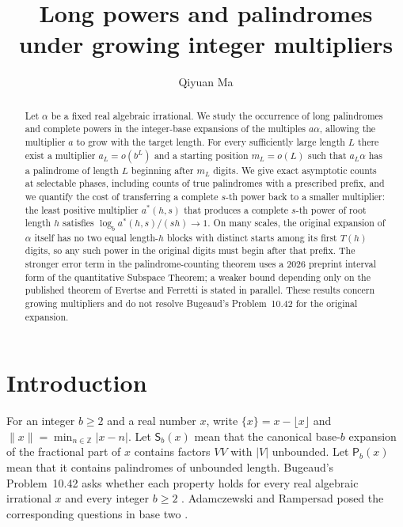 \documentclass[11pt,reqno,a4paper]{amsart}
\title[Powers and palindromes under growing multipliers]
{Long powers and palindromes under growing integer multipliers}
\date{}
\theoremstyle{remark}
\newcommand{\Z}{\mathbb Z}
\newcommand{\dist}[1]{\lVert#1\rVert}
\begin{document}
\author[Qiyuan Ma]{Qiyuan Ma\\[6pt]\protect\usebox{\affilbox}}

\begin{abstract}
Let $\alpha$ be a fixed real algebraic irrational. We study the occurrence of long palindromes and complete powers in the integer-base expansions of the multiples $a\alpha$, allowing the multiplier $a$ to grow with the target length. For every sufficiently large length $L$ there exist a multiplier $a_L=o(b^L)$ and a starting position $m_L=o(L)$ such that $a_L\alpha$ has a palindrome of length $L$ beginning after $m_L$ digits. We give exact asymptotic counts at selectable phases, including counts of true palindromes with a prescribed prefix, and we quantify the cost of transferring a complete $s$-th power back to a smaller multiplier: the least positive multiplier $a^*(h,s)$ that produces a complete $s$-th power of root length $h$ satisfies $\log_b a^*(h,s)/(sh)\to1$. On many scales, the original expansion of $\alpha$ itself has no two equal length-$h$ blocks with distinct starts among its first $T(h)$ digits, so any such power in the original digits must begin after that prefix. The stronger error term in the palindrome-counting theorem uses a $2026$ preprint interval form of the quantitative Subspace Theorem; a weaker bound depending only on the published theorem of Evertse and Ferretti is stated in parallel. These results concern growing multipliers and do not resolve Bugeaud's Problem~10.42 for the original expansion.
\end{abstract}
\maketitle

\section{Introduction}\label{sec:intro}

For an integer $b\ge2$ and a real number $x$, write $\{x\}=x-\lfloor x\rfloor$ and $\dist{x}=\min_{n\in\Z}|x-n|$. Let $\mathsf S_b(x)$ mean that the canonical base-$b$ expansion of the fractional part of $x$ contains factors $VV$ with $|V|$ unbounded. Let $\mathsf P_b(x)$ mean that it contains palindromes of unbounded length. Bugeaud's Problem~10.42 asks whether each property holds for every real algebraic irrational $x$ and every integer $b\ge2$ \cite[p.~220]{Bugeaud}. Adamczewski and Rampersad posed the corresponding questions in base two \cite{AR}.
\end{document}
